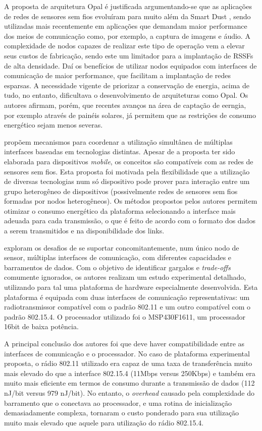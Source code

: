 \documentclass[
	12pt,				%
	openright,			%
	oneside,
	a4paper,			%
	english,			%
	french,				%
	spanish,			%
	brazil				%
	]{abntex2}
\begin{document}
A proposta de arquitetura Opal é justificada argumentando-se que as aplicações de redes de sensores sem fios evoluíram para muito além da Smart Dust \cite{Warneke2001}, sendo utilizadas mais recentemente em aplicações que demandam maior performance dos meios de comunicação como, por exemplo, a captura de imagens e áudio. A complexidade de nodos capazes de realizar este tipo de operação vem a elevar seus custos de fabricação, sendo este um limitador para a implantação de RSSFs de alta densidade. Daí os benefícios de utilizar nodos equipados com interfaces de comunicação de maior performance, que facilitam a implantação de redes esparsas. A necessidade vigente de priorizar a conservação de energia, acima de tudo, no entanto, dificultava o desenvolvimento de arquiteturas como Opal. Os autores afirmam, porém, que recentes avanços na área de captação de eerngia, por exemplo através de painéis solares, já permitem que as restrições de consumo energético sejam menos severas.

\cite{Pering2006} propõem mecanismos para coordenar a utilização simultânea de múltiplas interfaces baseadas em tecnologias distintas. Apesar de a proposta ter sido elaborada para dispositivos \textit{mobile}, os conceitos são compatíveis com as redes de sensores sem fios. Esta proposta foi motivada pela flexibilidade que a utilização de diversas tecnologias num só dispositivo pode prover para interação entre um grupo heterogêneo de dispositivos (possivelmente redes de sensores sem fios formadas por nodos heterogêneos). Os métodos propostos pelos autores permitem otimizar o consumo energético da plataforma selecionando a interface mais adeuada para cada transmissão, o que é feito de acordo com o formato dos dados a serem transmitidos e na disponibilidade dos links.

\cite{Lymberopoulos2008} exploram os desafios de se suportar concomitantemente, num único nodo de sensor, múltiplas interfaces de comunicação, com diferentes capacidades e barramentos de dados. Com o objetivo de identificar gargalos e \textit{trade-offs} comumente ignorados, os autores realizam um estudo experimental detalhado, utilizando para tal uma plataforma de hardware especialmente desenvolvida. Esta plataforma é equipada com duas interfaces de comunicação representativas: um radiotransmissor compatível com o padrão 802.11 e um outro compatível com o padrão 802.15.4. O processador utilizado foi o MSP430F1611, um processador 16bit de baixa potência.

A principal conclusão dos autores foi que deve haver compatibilidade entre as interfaces de comunicação e o processador. No caso de plataforma experimental proposta, o rádio 802.11 utilizado era capaz de uma taxa de transferência muito mais elevado do que a interface 802.15.4 (11Mbps versus 250Kbps) e também era muito mais eficiente em termos de consumo durante a transmissão  de dados (112 nJ/bit versus 979 nJ/bit). No entanto, o \textit{overhead} causado pela complexidade do barramento que o conectava ao processador, e uma rotina de inicialização demasiadamente complexa, tornaram o custo ponderado para sua utilização muito mais elevado que aquele para utilização do rádio 802.15.4.
\end{document}
